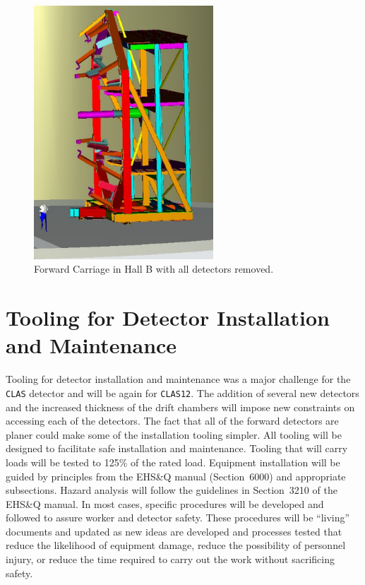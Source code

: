 \begin{figure}[htbp]
\centering
\includegraphics[width=0.6\textwidth]{fig5fc.eps}
\caption{\small{Forward Carriage in Hall B with all detectors removed.}}
\label{in_fc}
\end{figure}

\section{Tooling for Detector Installation and Maintenance}

Tooling for detector installation and maintenance was a major challenge 
for the {\tt CLAS} detector and will be again for {\tt CLAS12}. The 
addition of several new detectors and the increased thickness of the drift 
chambers will impose new constraints on accessing each of the detectors. 
The fact that all of the forward detectors are planer could make some of 
the installation tooling simpler. All tooling will be designed to facilitate 
safe installation and maintenance. Tooling that will carry loads will be 
tested to 125\% of the rated load. Equipment installation will be guided by 
principles from the EHS\&Q manual (Section~6000) and appropriate subsections.
Hazard analysis will follow the guidelines in Section~3210 of the EHS\&Q
manual.  In most cases, specific procedures will be developed and followed 
to assure worker and detector safety.  These procedures will be ``living'' 
documents and updated as new ideas are developed and processes tested that 
reduce the likelihood of equipment damage, reduce the possibility of 
personnel injury, or reduce the time required to carry out the work without 
sacrificing safety. 

